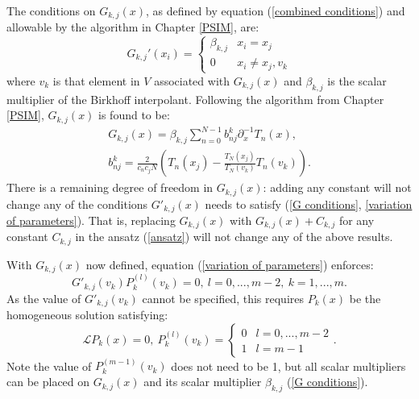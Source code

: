 \documentclass{sfuthesis}
\begin{document}
The conditions on $G_{k,j}(x)$, as defined by equation (\ref{combined conditions}) and allowable by the algorithm in Chapter \ref{PSIM}, are:
\begin{equation} \label{G conditions}
G_{k,j}'(x_i) = \begin{cases} \beta_{k,j} & x_i = x_j \\ 0 & x_i \neq x_j, v_k \end{cases}
\end{equation}
where $v_k$ is that element in $V$ associated with $G_{k,j}(x)$
and $\beta_{k,j}$ is the scalar multiplier of the Birkhoff interpolant.
Following the algorithm from Chapter \ref{PSIM}, $G_{k,j}(x)$ is found to be:
\begin{equation} \label{eq:G functions}
\begin{gathered}
G_{k,j} (x) = \beta_{k,j} \sum_{n=0}^{N-1} b^k_{nj} \partial_x^{-1} T_n(x), \\
 b^k_{nj} = \frac{2}{c_n c_j N} \left ( T_n(x_j) - \frac{T_N(x_j)}{T_N(v_k)} T_n(v_k) \right ).
\end{gathered}
\end{equation}
There is a remaining degree of freedom in $G_{k,j}(x)$: 
adding any constant will not change any of the conditions $G'_{k,j}(x)$ needs to satisfy (\ref{G conditions}, \ref{variation of parameters}).
That is, replacing $G_{k,j}(x)$ with $G_{k,j}(x) + C_{k,j}$ for any constant $C_{k,j}$ in the ansatz (\ref{ansatz}) will not change any of the above results.

With $G_{k,j}(x)$ now defined, equation (\ref{variation of parameters}) enforces:
\begin{equation}
G'_{k,j}(v_k) P_k^{(l)}(v_k) = 0, \ l = 0,...,m-2, \ k = 1,...,m .
\end{equation}
As the value of $G'_{k,j}(v_k)$ cannot be specified, this requires $P_k(x)$ be the homogeneous solution satisfying: %
\begin{equation} \label{homog solns}
\mathcal{L}P_k(x) = 0, \ P_k^{(l)}(v_k) = \begin{cases} 0 & l = 0,...,m-2 \\ 1 & l = m-1 \end{cases} .
\end{equation}
Note the value of $P_k^{(m-1)}(v_k)$ does not need to be 1, but all scalar multipliers can be placed on $G_{k,j}(x)$ and its scalar multiplier $\beta_{k,j}$ (\ref{G conditions}).
\end{document}
